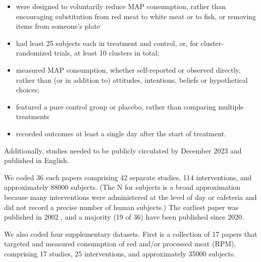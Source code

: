 \documentclass[sn-nature,referee,pdflatex]{sn-jnl}
\begin{document}
\begin{itemize}
\item
  were designed to voluntarily reduce MAP consumption, rather than
  encouraging substitution from red meat to white meat or to fish, or
  removing items from someone's plate
\item
  had least 25 subjects each in treatment and control, or, for
  cluster-randomized trials, at least 10 clusters in total;
\item
  measured MAP consumption, whether self-reported or observed directly,
  rather than (or in addition to) attitudes, intentions, beliefs or
  hypothetical choices;
\item
  featured a pure control group or placebo, rather than comparing
  multiple treatments
\item
  recorded outcomes at least a single day after the start of treatment.
\end{itemize}

Additionally, studies needed to be publicly circulated by December 2023
and published in English.

We coded 36 such papers
\citep{andersson2021, kanchanachitra2020, abrahamse2007, acharya2004, banerjee2019, bianchi2022, bochmann2017, bschaden2020, carfora2023, hennessy2016, piester2020, cooney2014, cooney2016, feltz2022, haile2021, hatami2018, jalil2023, mathur2021effectiveness, merrill2009, norris2014, peacock2017, polanco2022, sparkman2021, weingarten2022, aldoh2023, allen2002, camp2019, coker2022, griesoph2021, sparkman2017, sparkman2020, berndsen2005, bertolaso2015, fehrenbach2015, mattson2020, shreedhar2021}
comprising 42 separate studies, 114 interventions, and approximately
88000 subjects. (The N for subjects is a broad approximation because
many interventions were administered at the level of day or cafeteria
and did not record a precise number of human subjects.) The earliest
paper was published in 2002 \citep{allen2002}, and a majority (19 of 36)
have been published since 2020.

We also coded four supplementary datasets. First is a collection of 17
papers
\citep{anderson2017, carfora2017correlational, carfora2017randomised, carfora2019, carfora2019informational, delichatsios2001talking, dijkstra2022, emmons2005cancer, emmons2005project, jaacks2014, james2015, lee2018, perino2022, schatzkin2000, sorensen2005, wolstenholme2020}
that targeted and measured consumption of red and/or processed meat
(RPM), comprising 17 studies, 25 interventions, and approximately 35000
subjects.
\end{document}
